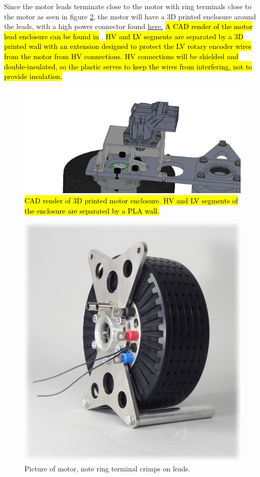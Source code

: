 \documentclass{article}
\DeclareRobustCommand{\hlr}[1]{{\sethlcolor{pink}\hl{#1}}}
\begin{document}
Since the motor leads terminate close to the motor with ring terminals close to the motor as seen in figure \ref{motor_pic}, the motor will have a 3D printed enclosure around the leads, with a high power connector found \href{http://www.te.com/usa-en/product-2141230-2.html}{here.} \hlr{A CAD render of the motor lead enclosure can be found in }. \hlr{HV and LV segments are separated by a 3D printed wall with an extension designed to protect the LV rotary encoder wires from the motor from HV connections. HV connections will be shielded and double-insulated, so the plastic serves to keep the wires from interfering, not to provide insulation.}

\begin{figure}[H]
    \centering
    \includegraphics[width = 0.8 \textwidth]{MotorBoxAssemblyRender2}
    \caption{\hlr{CAD render of 3D printed motor enclosure. HV and LV segments of the enclosure are separated by a PLA wall.}}
    \label{fig:motor_enclosure}
\end{figure}

\begin{figure}[H]
    \centering
    \includegraphics[width = 0.6 \textwidth]{motor_pic}
    \caption{Picture of motor, note ring terminal crimps on leads. }
    \label{motor_pic}
\end{figure}
\end{document}
